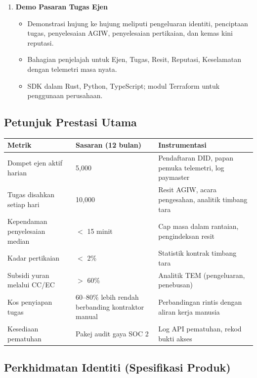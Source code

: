 \documentclass[11pt]{article}
\begin{document}
\begin{enumerate}[label=\textbf{D\arabic*.}, leftmargin=*]
  \item \textbf{Demo Pasaran Tugas Ejen}
  \begin{itemize}[noitemsep]
    \item Demonstrasi hujung ke hujung meliputi pengeluaran identiti, penciptaan tugas, penyelesaian AGIW, penyelesaian pertikaian, dan kemas kini reputasi.
    \item Bahagian penjelajah untuk Ejen, Tugas, Resit, Reputasi, Keselamatan dengan telemetri masa nyata.
    \item SDK dalam Rust, Python, TypeScript; modul Terraform untuk penggunaan perusahaan.
  \end{itemize}
\end{enumerate}

\subsection{Petunjuk Prestasi Utama}
\begin{longtable}{@{}p{}p{}p{}@{}}
\toprule
\textbf{Metrik} & \textbf{Sasaran (12 bulan)} & \textbf{Instrumentasi} \\\midrule
Dompet ejen aktif harian & 5,000 & Pendaftaran DID, papan pemuka telemetri, log paymaster \\
Tugas disahkan setiap hari & 10,000 & Resit AGIW, acara pengesahan, analitik timbang tara \\
Kependaman penyelesaian median & $<$ 15 minit & Cap masa dalam rantaian, pengindeksan resit \\
Kadar pertikaian & $<$ 2\% & Statistik kontrak timbang tara \\
Subsidi yuran melalui CC/EC & $>$ 60\% & Analitik TEM (pengeluaran, penebusan) \\
Kos penyiapan tugas & 60--80\% lebih rendah berbanding kontraktor manual & Perbandingan rintis dengan aliran kerja manusia \\
Kesediaan pematuhan & Pakej audit gaya SOC 2 & Log API pematuhan, rekod bukti akses \\
\bottomrule
\end{longtable}

\subsection{Perkhidmatan Identiti (Spesifikasi Produk)}
\label{sec:identity-spec}
\end{document}
